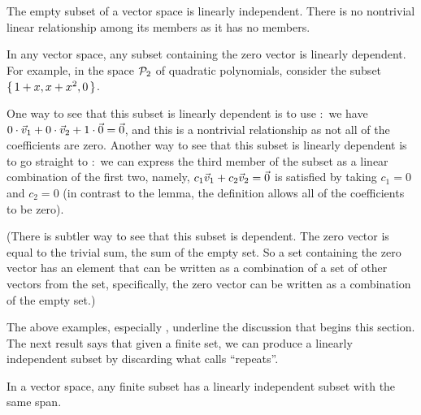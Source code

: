 \begin{example} \label{ex:EmSetLI}
The empty subset of a vector space is linearly independent.
There is no nontrivial linear relationship among its members as it has
no members.
\end{example}

\begin{example} \label{ex:SetWithZeroVecLD}
In any vector space, any subset containing the zero vector is linearly 
dependent.
For example, in the space $\mathcal{P}_2$ of quadratic polynomials, 
consider the subset $\mbox{$\{\,1+x,x+x^2,0\,\}$}$.

One way to see that this subset is linearly 
dependent is to use :~we have  
$0\cdot\vec{v}_1+0\cdot\vec{v}_2+1\cdot\vec{0}=\vec{0}$, and this is a nontrivial
relationship as not all of the coefficients are zero.
Another way to see that this subset is
linearly dependent is to go straight to :~we
can express the third member of the subset
as a linear combination of the 
first two, namely, $c_1\vec{v}_1+c_2\vec{v}_2=\vec{0}$ is 
satisfied by taking $c_1=0$ and $c_2=0$
(in contrast to the lemma, the definition allows all of the coefficients to 
be zero).

(There is subtler way to see that this subset is dependent.
The zero vector is equal to the trivial sum, 
the sum of the empty set.
So a set containing the zero vector has an element that
can be written as a combination of a set of other vectors from the 
set, specifically,
the zero vector can be written as a combination of the empty set.)
\end{example}

The above examples, especially ,
underline the discussion that begins this section.
The next result 
says that given a finite set,
we can produce a linearly independent subset
by discarding what 
calls ``repeats''.


\begin{theorem}
\label{th:AlwaysAnLDSubset}
In a vector space,
any finite subset has a linearly independent subset with the same span.
\end{theorem}

